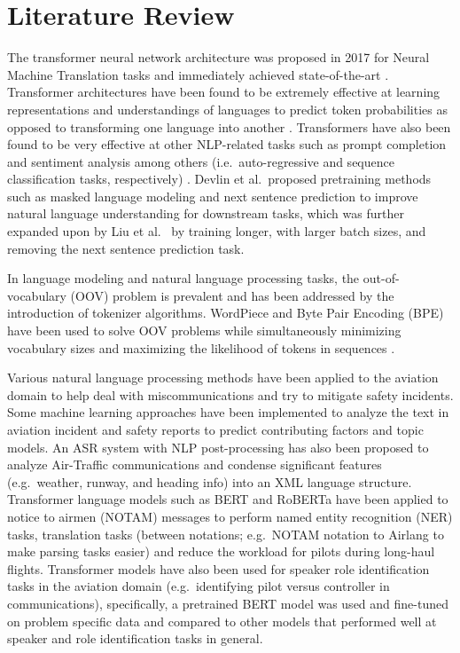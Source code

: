 \documentclass[12pt]{article}
\begin{document}
\section{Literature Review}\label{sec:lit_review}
The transformer neural network architecture was proposed in 2017 for Neural Machine Translation tasks and immediately achieved
state-of-the-art \cite{vaswani_attention_2017}. Transformer architectures have been found to be extremely effective at learning representations and
understandings of languages to predict token probabilities as opposed to transforming one language into another
\cite{devlin_bert_2019,liu_roberta_2019}. Transformers have also been found to be very effective at other NLP-related tasks such as prompt completion
and sentiment analysis among others (i.e.~auto-regressive and sequence classification tasks, respectively)
\cite{lewis_bart_2019,radford_improving_2018}. Devlin et al.~\cite{devlin_bert_2019}proposed pretraining methods such as masked language modeling and
next sentence prediction to improve natural language understanding for downstream tasks, which was further expanded upon by Liu et
al.~\cite{liu_roberta_2019} by training longer, with larger batch sizes, and removing the next sentence prediction task.

In language modeling and natural language processing tasks, the out-of-vocabulary (OOV) problem is prevalent and has been addressed by the
introduction of tokenizer algorithms. WordPiece and Byte Pair Encoding (BPE) have been used to solve OOV problems while simultaneously minimizing
vocabulary sizes and maximizing the likelihood of tokens in sequences \cite{wu_googles_2016,schuster_japanese_2012,sennrich_neural_2016}.

Various natural language processing methods have been applied to the aviation domain to help deal with miscommunications
and try to mitigate safety incidents\cite{ragnarsdottir_language_2003,tanguy_natural_2016,madeira_machine_2021}.
Some machine learning approaches have been implemented to analyze the text in aviation incident and safety reports to predict
contributing factors and topic models\cite{tanguy_natural_2016,madeira_machine_2021}. An ASR system with NLP post-processing
has also been proposed to analyze Air-Traffic communications and condense significant features (e.g.~weather, runway, and
heading info) into an XML language structure\cite{ragnarsdottir_language_2003}. Transformer language models such as BERT and RoBERTa have been applied
to notice to airmen (NOTAM) messages to perform named entity recognition (NER) tasks, translation tasks (between notations; e.g.~NOTAM notation to
Airlang to make parsing tasks easier) and reduce the workload for pilots during long-haul flights\cite{arnold_knowledge_2022}. Transformer models
have also been used for speaker role identification tasks in the aviation domain (e.g.~identifying pilot versus controller in communications),
specifically, a pretrained BERT model was used and fine-tuned on problem specific data and compared to other models that performed well at speaker
and role identification tasks in general\cite{guo_comparative_2022}.
\end{document}
